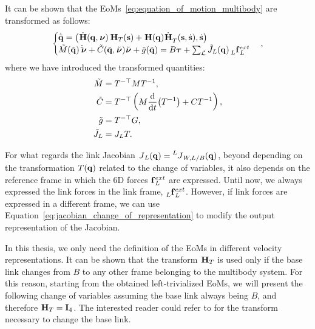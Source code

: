 It can be shown that the \acp{EoM}~\eqref{eq:equation_of_motion_multibody} are transformed as follows:
%
\begin{equation*}
    \begin{cases}
        \dot{\tilde{\Qu}} = \left( \homod(\Qu, \Nu) \homo_T(\Shape) + \homo(\Qu) \dot{\homo}_T(\Shape, \Shaped), \Shaped \right) \\
        \tilde{M}(\tilde{\Qu})\dot{\tilde{\Nu}} + \tilde{C}(\tilde{\Qu}, \tilde{\Nu}) \tilde{\Nu} + \tilde{g}(\tilde{\Qu}) = B \Torques + \sum_{\mathcal{L}} \tilde{J}_L(\Qu) \forcesix[L]_L^{ext}
    \end{cases}
    ,
\end{equation*}
%
where we have introduced the transformed quantities:
%
\begin{equation}
    \label{eq:eom_change_of_variables}
    \begin{aligned}
        \tilde{M} &= T^{-\top} M T^{-1} ,\\
        \tilde{C} &= T^{-\top} \left( M \dv{t}(T^{-1}) + CT^{-1} \right) ,\\
        \tilde{g} &= T^{-\top} G ,\\
        \tilde{J}_L &= J_L T.
    \end{aligned}  
\end{equation}

\begin{remark}
%
For what regards the link Jacobian $\jac_L(\Qu) = \jac[L]_{W,L/B}(\Qu)$, beyond depending on the transformation $T(\Qu)$ related to the change of variables, it also depends on the reference frame in which the 6D forces $\forcesix^{ext}_L$ are expressed.
Until now, we always expressed the link forces in the link frame, \ie $\forcesix[L]^{ext}_L$.
However, if link forces are expressed in a different frame, we can use Equation~\eqref{eq:jacobian_change_of_representation} to modify the output representation of the Jacobian.
%
\end{remark}

In this thesis, we only need the definition of the \acp{EoM} in different velocity representations.
It can be shown that the transform $\homo_T$ is used only if the base link changes from $B$ to any other frame belonging to the multibody system.
For this reason, starting from the obtained left-trivialized \acp{EoM}, we will present the following change of variables assuming the base link always being $B$, and therefore $\homo_T = \eye_4$.
The interested reader could refer to \parencite{traversaro_modelling_2017} for the transform necessary to change the base link.

